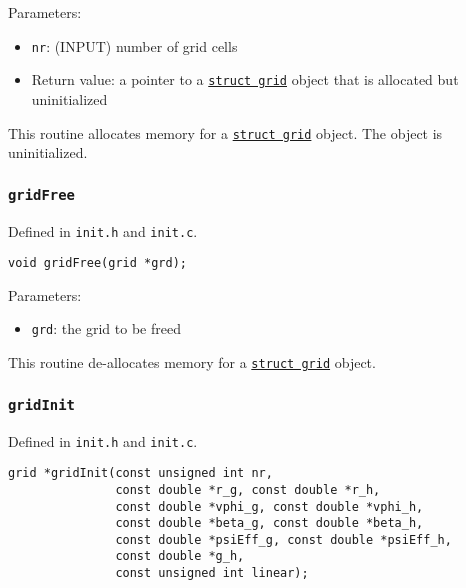 \documentclass[12pt]{article}
\begin{document}
Parameters:
\begin{itemize}
\item \texttt{nr}: (INPUT) number of grid cells
\item Return value: a pointer to a \hyperref[sssec:datastructures]{\texttt{struct grid}} object that is allocated but uninitialized
\end{itemize}

This routine allocates memory for a \hyperref[sssec:datastructures]{\texttt{struct grid}} object. The object is uninitialized.

\subsubsection{\texttt{gridFree}}
\label{sssec:gridFree}

Defined in \texttt{init.h} and \texttt{init.c}.

\begin{verbatim}
void gridFree(grid *grd);
\end{verbatim}

Parameters:
\begin{itemize}
\item \texttt{grd}: the grid to be freed
\end{itemize}

This routine de-allocates memory for a \hyperref[sssec:datastructures]{\texttt{struct grid}} object.


\subsubsection{\texttt{gridInit}}
\label{sssec:gridInit}

Defined in \texttt{init.h} and \texttt{init.c}.

\begin{verbatim}
grid *gridInit(const unsigned int nr,
               const double *r_g, const double *r_h, 
               const double *vphi_g, const double *vphi_h, 
               const double *beta_g, const double *beta_h, 
               const double *psiEff_g, const double *psiEff_h,
               const double *g_h,
               const unsigned int linear);
\end{verbatim}
\end{document}
